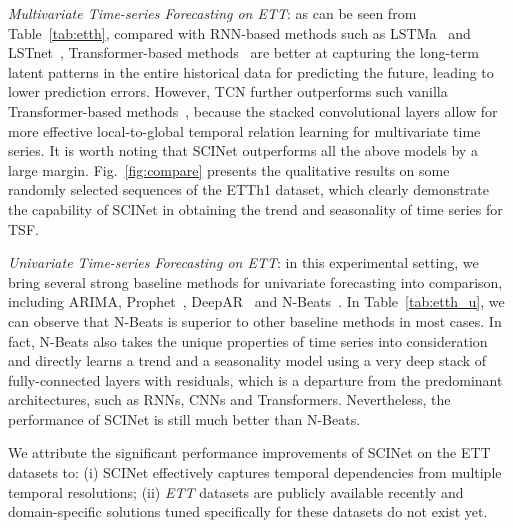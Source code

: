 \documentclass{article}
\begin{document}
\emph{Multivariate Time-series Forecasting on ETT}: as can be seen from Table~\ref{tab:etth}, compared with RNN-based methods such as LSTMa~\citep{bahdanau2015neural} and LSTnet~\citep{Lai2018ModelingLA}, Transformer-based methods~\citep{kitaev2019reformer,li2019enhancing,Zhou2020InformerBE} are better at capturing the long-term latent patterns in the entire historical data for predicting the future, 
leading to lower prediction errors. 
However, TCN
further outperforms such vanilla Transformer-based methods~\citep{kitaev2019reformer,li2019enhancing,Zhou2020InformerBE}, because the stacked convolutional layers allow for more effective local-to-global temporal relation learning for multivariate time series.
It is worth noting that SCINet outperforms all the above models by a large margin. Fig.~\ref{fig:compare} presents the qualitative results on some randomly selected sequences of the ETTh1 dataset, which clearly demonstrate the capability of SCINet in obtaining the trend and seasonality of time series for TSF. 

\emph{Univariate Time-series Forecasting on ETT}: 
in this experimental setting, we bring several strong baseline methods for univariate forecasting into comparison, including ARIMA, Prophet~\citep{Taylor2018ForecastingAS}, DeepAR~\citep{salinas2020deepar} and N-Beats~\citep{ Oreshkin2020NBeats}. 
In Table~\ref{tab:etth_u}, we can observe that N-Beats is superior to other baseline methods in most cases. In fact, N-Beats also takes the unique properties of time series into consideration and directly learns a trend and a seasonality model using a very deep stack of fully-connected layers with residuals, which is a departure from the predominant architectures, such as RNNs, CNNs and Transformers. Nevertheless, the performance of SCINet is still much better than N-Beats. 

We attribute the significant performance improvements of SCINet on the ETT datasets to: (i) SCINet effectively captures temporal dependencies from multiple temporal resolutions; (ii) \textit{ETT} datasets are publicly available recently and domain-specific solutions tuned specifically for these datasets do not exist yet. 
\end{document}
